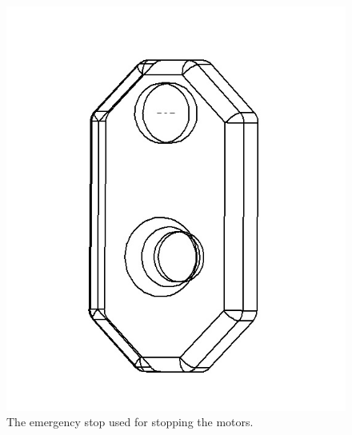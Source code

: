 \begin{figure}[!ht]
	\begin{center}
		\includegraphics[width=13.2cm]{./Images/Mechanics/emStop.jpg}
		\caption{The emergency stop used for stopping the motors.}
		\label{SomeemStop}
	\end{center}
\end{figure}

